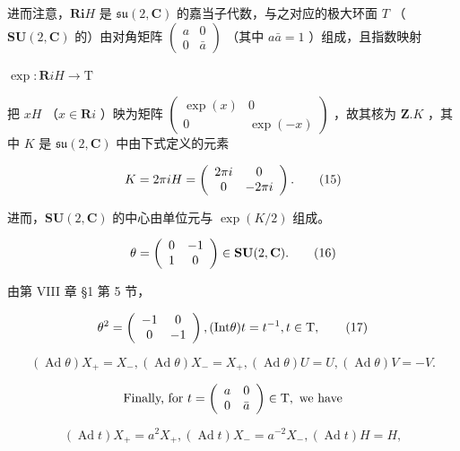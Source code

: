 进而注意，\(\mathbf{Ri}H\) 是 \(\mathfrak{su}(2,\mathbf{C})\) 的嘉当子代数，与之对应的极大环面 \(T\) （\(\mathbf{SU}(2,\mathbf{C})\) 的）由对角矩阵 \(\left( \begin{array}{cc}a & 0\\ 0 & \bar{a} \end{array} \right)\) （其中 \(a\bar{a} = 1\) ）组成，且指数映射

\(\exp : \mathbf{R}iH \to \mathrm{T}\)

把 \(xH\) （\(x \in \mathbf{R}i\) ）映为矩阵 \(\left( \begin{array}{cc}\exp (x) & 0\\ 0 & \exp (-x) \end{array} \right)\) ，故其核为 \(\mathbf{Z}.K\) ，其中 \(K\) 是 \(\mathfrak{su}(2,\mathbf{C})\) 中由下式定义的元素

\[
K = 2 \pi i H = \left( \begin{array}{c c} 2 \pi i & 0 \\ 0 & - 2 \pi i \end{array} \right).\tag{15}
\]

进而，\(\mathbf{SU}(2,\mathbf{C})\) 的中心由单位元与 \(\exp (K / 2)\) 组成。

\[
\theta = \left( \begin{array}{c c} 0 & - 1 \\ 1 & 0 \end{array} \right) \in \mathbf {S U} (2, \mathbf {C}).\tag{16}
\]

由第 VIII 章 §1 第 5 节，

\[
\theta^ {2} = \left( \begin{array}{c c} - 1 & 0 \\ 0 & - 1 \end{array} \right), (\text {Int}   \theta) t = t ^ {- 1}, t \in \text {T},\tag{17}
\]

\[
(\operatorname{Ad} \theta) X _ {+} = X _ {-}, (\operatorname{Ad} \theta) X _ {-} = X _ {+}, (\operatorname{Ad} \theta) U = U, (\operatorname{Ad} \theta) V = - V.\tag{18}
\]

\[
\text {   Finally,   for   } t = \left( \begin{array}{c c} a & 0 \\ 0 & \bar {a} \end{array} \right) \in \mathrm{T}, \text {   we   have   }
\]

\[
(\operatorname{Ad} t) X _ {+} = a ^ {2} X _ {+}, (\operatorname{Ad} t) X _ {-} = a ^ {- 2} X _ {-}, (\operatorname{Ad} t) H = H,\tag{19}
\]

